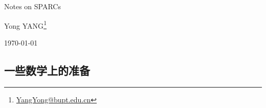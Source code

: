 \documentclass[12pt]{article}
\begin{document}
\begin{titlepage}\Large
	\renewcommand{\thefootnote}{\fnsymbol{footnote}}
	\begin{center}
		\vspace*{3cm}
		{\Huge\color{blue} Notes on SPARCs} \bigskip
		
		{\LARGE Yong YANG\footnote{{\large \url{YangYong@bupt.edu.cn}}}} \medskip
		
		\today
		
	\end{center}
\end{titlepage}

\clearpage
\tableofcontents  %
	
	
	\subsection{一些数学上的准备}
\end{document}

